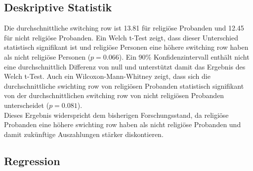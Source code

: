 \documentclass[11pt,a4paper]{article}
\begin{document}
\subsection{Deskriptive Statistik}
Die durchschnittliche switching row ist 13.81 für religiöse Probanden und 12.45 für nicht religiöse Probanden. Ein Welch t-Test zeigt, dass dieser Unterschied statistisch signifikant ist und religiöse Personen eine höhere switching row haben als nicht religiöse Personen ($p = 0.066$). Ein 90\% Konfidenzintervall enthält nicht eine durchschnittlich Differenz von null und unterstützt damit das Ergebnis des Welch t-Test. Auch ein Wilcoxon-Mann-Whitney zeigt, dass sich die durchschnittliche swichting row von religiösen Probanden statistisch signifikant von der durchschnittlichen switching row von nicht religiösen Probanden unterscheidet ($p = 0.081$).\\ 

Dieses Ergebnis widerspricht dem bisherigen Forschungsstand, da religiöse Probanden eine höhere swichting row haben als nicht religiöse Probanden und damit zukünftige Auszahlungen stärker diskontieren. 


\subsection{Regression} 
\end{document}
